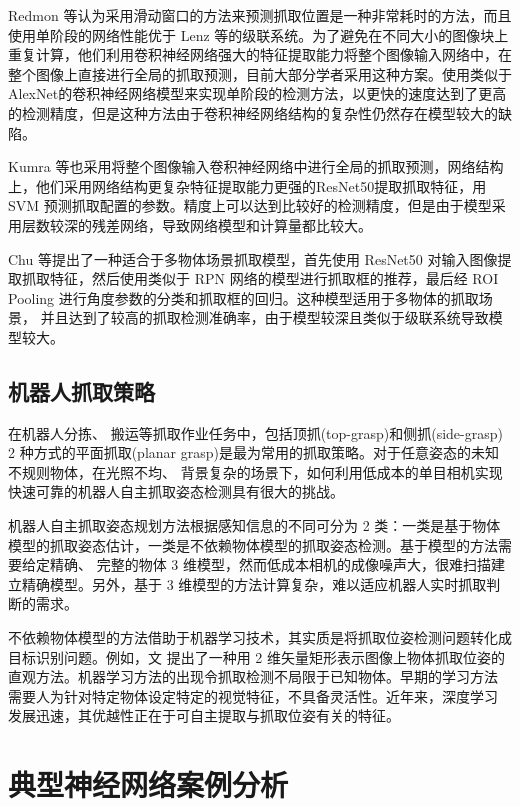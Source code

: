 \documentclass{hitszthesis}
\begin{document}
Redmon 等认为采用滑动窗口的方法来预测抓取位置是一种非常耗时的方法，而且使用单阶段的网络性能优于 Lenz 等的级联系统。为了避免在不同大小的图像块上重复计算，他们利用卷积神经网络强大的特征提取能力将整个图像输入网络中，在整个图像上直接进行全局的抓取预测，目前大部分学者采用这种方案。使用类似于 AlexNet的卷积神经网络模型来实现单阶段的检测方法，以更快的速度达到了更高的检测精度，但是这种方法由于卷积神经网络结构的复杂性仍然存在模型较大的缺陷。 

Kumra 等也采用将整个图像输入卷积神经网络中进行全局的抓取预测，网络结构上，他们采用网络结构更复杂特征提取能力更强的ResNet50提取抓取特征，用 SVM 预测抓取配置的参数。精度上可以达到比较好的检测精度，但是由于模型采用层数较深的残差网络，导致网络模型和计算量都比较大。

Chu 等提出了一种适合于多物体场景抓取模型，首先使用 ResNet50 对输入图像提取抓取特征，然后使用类似于 RPN  网络的模型进行抓取框的推荐，最后经 ROI  Pooling 进行角度参数的分类和抓取框的回归。这种模型适用于多物体的抓取场景， 并且达到了较高的抓取检测准确率，由于模型较深且类似于级联系统导致模型较大。

\section{机器人抓取策略}

在机器人分拣、 搬运等抓取作业任务中，包括顶抓(top-grasp)和侧抓(side-grasp) 2 种方式的平面抓取(planar grasp)是最为常用的抓取策略。对于任意姿态的未知不规则物体，在光照不均、 背景复杂的场景下，如何利用低成本的单目相机实现快速可靠的机器人自主抓取姿态检测具有很大的挑战。

机器人自主抓取姿态规划方法根据感知信息的不同可分为 2 类：一类是基于物体模型的抓取姿态估计，一类是不依赖物体模型的抓取姿态检测。基于模型的方法需要给定精确、 完整的物体 3 维模型，然而低成本相机的成像噪声大，很难扫描建立精确模型。另外，基于 3 维模型的方法计算复杂，难以适应机器人实时抓取判断的需求。

不依赖物体模型的方法借助于机器学习技术，其实质是将抓取位姿检测问题转化成目标识别问题。例如，文\cite{bibb4} 提出了一种用 2 维矢量矩形表示图像上物体抓取位姿的直观方法。机器学习方法的出现令抓取检测不局限于已知物体。早期的学习方法 需要人为针对特定物体设定特定的视觉特征，不具备灵活性。近年来，深度学习 发展迅速，其优越性正在于可自主提取与抓取位姿有关的特征。 

\chapter{典型神经网络案例分析}
\end{document}
